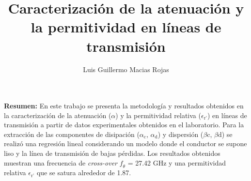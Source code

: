 \documentclass{article}   %
\title{Caracterización de la atenuación y la permitividad en líneas de transmisión}
\author{Luis Guillermo Macias Rojas}
\newcommand*{\freq}{\mathord{\mathit{f}}}
\theoremstyle{mytheoremstyle}
\theoremstyle{mytheoremstyle}
\theoremstyle{myproblemstyle}
\begin{document}
    \maketitle

    \selectfont %
    \noindent
    \textbf{Resumen:} En este trabajo se presenta la metodología y resultados obtenidos en la caracterización de la atenuación 
    ($\alpha$) y la permitividad relativa ($\epsilon_{\text{r'}}$) en líneas de transmisión a partir de datos experimentales
    obtenidos en el laboratorio. Para la extracción de las componentes de disipación ($\alpha_{\text{c}}$, $\alpha_{\text{d}}$) 
    y dispersión ($\beta{\text{c}}$, $\beta{\text{d}}$) se realizó una regresión lineal considerando un modelo donde el conductor se 
    supone liso y la línea de transmisión de bajas pérdidas. Los resultados obtenidos muestran una frecuencia de \textit{cross-over} 
    $\freq_{\theta}$ = 27.42 GHz y una permitividad relativa $\epsilon_{\text{r'}}$ que se satura alrededor de 1.87.
\end{document}
